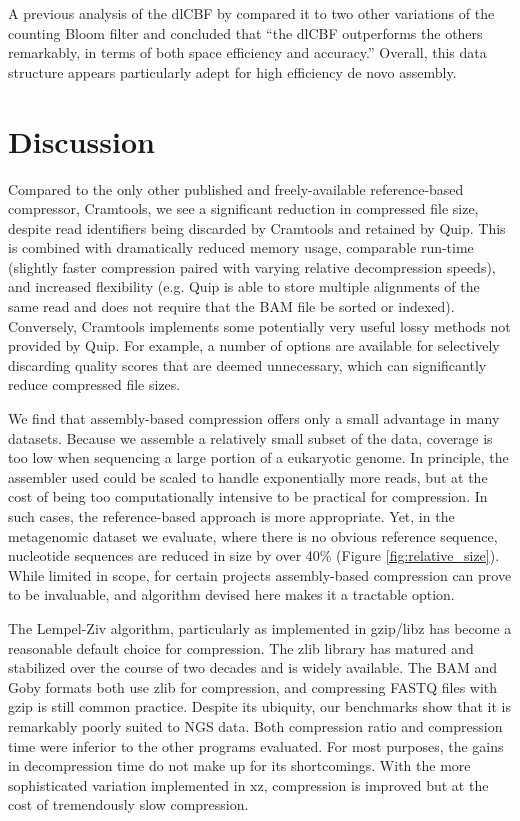 \documentclass[twocolumn]{article}
\begin{document}
A previous analysis of the dlCBF by \citet{Zhang2009} compared it to two other
variations of the counting Bloom filter and concluded that ``the dlCBF
outperforms the others remarkably, in terms of both space efficiency and
accuracy.'' Overall, this data structure appears particularly adept for high
efficiency de novo assembly.

\section{Discussion}

Compared to the only other published and freely-available reference-based
compressor, Cramtools, we see a significant reduction in compressed file size,
despite read identifiers being discarded by Cramtools and retained by Quip.
This is combined with dramatically reduced memory usage, comparable run-time
(slightly faster compression paired with varying relative decompression
speeds), and increased flexibility (e.g. Quip is able to store multiple
alignments of the same read and does not require that the BAM file be sorted
or indexed). Conversely, Cramtools implements some potentially very useful
lossy methods not provided by Quip. For example, a number of options are
available for selectively discarding quality scores that are deemed
unnecessary, which can significantly reduce compressed file sizes.

We find that assembly-based compression offers only a small advantage in many
datasets. Because we assemble a relatively small subset of the data, coverage
is too low when sequencing a large portion of a eukaryotic genome. In
principle, the assembler used could be scaled to handle exponentially more
reads, but at the cost of being too computationally intensive to be practical
for compression. In such cases, the reference-based approach is more
appropriate. Yet, in the metagenomic dataset we evaluate, where there is no
obvious reference sequence, nucleotide sequences are reduced in size by over
40\% (Figure \ref{fig:relative_size}). While limited in scope, for certain
projects assembly-based compression can prove to be invaluable, and algorithm
devised here makes it a tractable option.

The Lempel-Ziv algorithm, particularly as implemented in gzip/libz has become
a reasonable default choice for compression. The zlib library has matured and
stabilized over the course of two decades and is widely available. The BAM and
Goby formats both use zlib for compression, and compressing FASTQ files with
gzip is still common practice. Despite its ubiquity, our benchmarks show that
it is remarkably poorly suited to NGS data. Both compression ratio and
compression time were inferior to the other programs evaluated. For most
purposes, the gains in decompression time do not make up for its shortcomings.
With the more sophisticated variation implemented in xz, compression is improved
but at the cost of tremendously slow compression.
\end{document}
